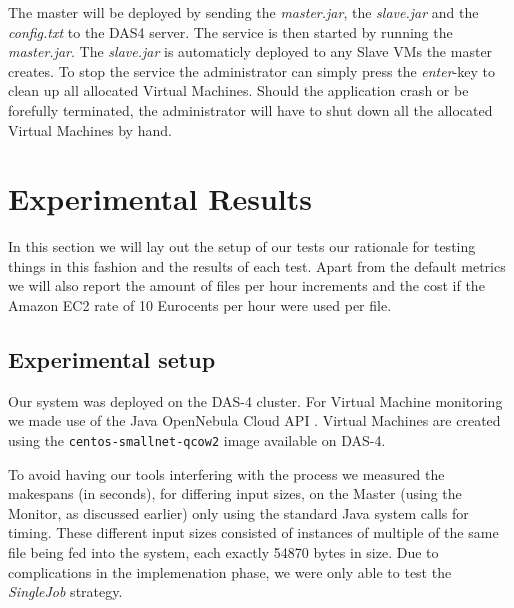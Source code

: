 \documentclass[twocolumn,twoside]{IEEEtran}
\begin{document}
The master will be deployed by sending the \emph{master.jar}, the \emph{slave.jar}
and the \emph{config.txt} to the DAS4 server. The service is then started by
running the \emph{master.jar}. The \emph{slave.jar} is automaticly deployed to
any Slave VMs the master creates. To stop the service the administrator
can simply press the \emph{enter}-key to clean up all allocated Virtual Machines.
Should the application crash or be forefully terminated, the administrator will
have to shut down all the allocated Virtual Machines by hand.

\section{Experimental Results}
\label{sec:setup}
In this section we will lay out the setup of our tests
our rationale for testing things in this fashion and the
results of each test. Apart from the default metrics
we will also report the amount of files per hour increments and 
the cost if the Amazon EC2 rate of 10 Eurocents per
hour were used per file.

\subsection{Experimental setup}
Our system was deployed on the DAS-4 cluster\cite{das4}.
For Virtual Machine monitoring we made use of the 
Java OpenNebula Cloud API \cite{opennebulaapi}. Virtual Machines are created using the \texttt{centos-smallnet-qcow2} image available on DAS-4.

To avoid having our tools interfering with the process
we measured the makespans (in seconds), for differing
input sizes,
on the Master (using the Monitor, as discussed earlier) only using the standard Java system calls
for timing.
These different input sizes consisted of instances of
multiple of the same file being fed into the system, each exactly 54870 bytes in size. 
Due to complications in the implemenation phase, we were
only able to test the \emph{SingleJob} strategy.
\end{document}
